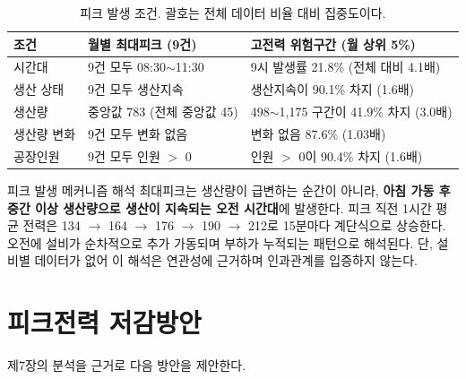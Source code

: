 \documentclass[11pt,a4paper]{article}
\begin{document}
\begin{table}[H]
\centering\small
\begin{tabular}{lp{5.2cm}p{6.2cm}}
\toprule
조건 & 월별 최대피크 (9건) & 고전력 위험구간 (월 상위 5\%) \\
\midrule
시간대 & 9건 모두 08:30$\sim$11:30 & 9시 발생률 21.8\% (전체 대비 4.1배) \\
생산 상태 & 9건 모두 생산지속 & 생산지속이 90.1\% 차지 (1.6배) \\
생산량 & 중앙값 783 (전체 중앙값 45) & 498$\sim$1,175 구간이 41.9\% 차지 (3.0배) \\
생산량 변화 & 9건 모두 변화 없음 & 변화 없음 87.6\% (1.03배) \\
공장인원 & 9건 모두 인원 $>$ 0 & 인원 $>$ 0이 90.4\% 차지 (1.6배) \\
\bottomrule
\end{tabular}
\caption{피크 발생 조건. 괄호는 전체 데이터 비율 대비 집중도이다.}
\end{table}

\begin{keybox}{피크 발생 메커니즘 해석}
최대피크는 생산량이 급변하는 순간이 아니라, \textbf{아침 가동 후 중간 이상 생산량으로 생산이 지속되는 오전 시간대}에 발생한다. 피크 직전 1시간 평균 전력은 134 $\rightarrow$ 164 $\rightarrow$ 176 $\rightarrow$ 190 $\rightarrow$ 212로 15분마다 계단식으로 상승한다. 오전에 설비가 순차적으로 추가 가동되며 부하가 누적되는 패턴으로 해석된다. 단, 설비별 데이터가 없어 이 해석은 연관성에 근거하며 인과관계를 입증하지 않는다.
\end{keybox}

\section{피크전력 저감방안}
제7장의 분석을 근거로 다음 방안을 제안한다.
\end{document}
